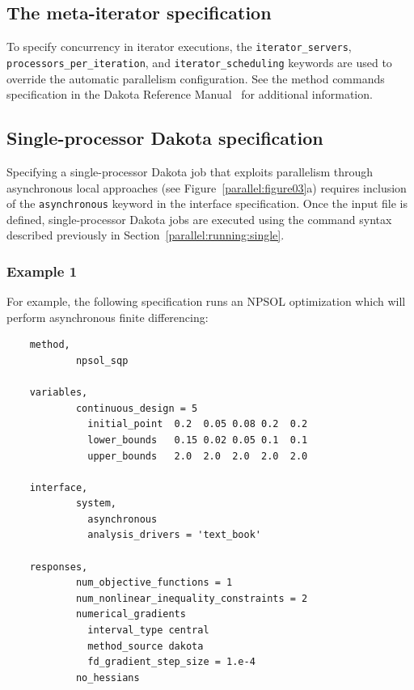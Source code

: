 \subsection{The meta-iterator specification}\label{parallel:spec:strategy}

To specify concurrency in iterator executions, the
\texttt{iterator\_servers}, \texttt{processors\_per\_iteration}, and
\texttt{iterator\_scheduling} keywords are used to override the 
automatic parallelism configuration. See the method commands 
specification in the Dakota Reference Manual~\cite{RefMan} for 
additional information.

\subsection{Single-processor Dakota specification}\label{parallel:spec:single}

Specifying a single-processor Dakota job that exploits parallelism
through asynchronous local approaches (see
Figure~\ref{parallel:figure03}a) requires inclusion of the
\texttt{asynchronous} keyword in the interface specification. Once the
input file is defined, single-processor Dakota jobs are executed using
the command syntax described previously in
Section~\ref{parallel:running:single}.

\subsubsection{Example 1}\label{parallel:spec:single:example1}

For example, the following specification runs an NPSOL optimization
which will perform asynchronous finite differencing:
\begin{small}
\begin{verbatim}
    method,
            npsol_sqp

    variables,
            continuous_design = 5
              initial_point  0.2  0.05 0.08 0.2  0.2
              lower_bounds   0.15 0.02 0.05 0.1  0.1
              upper_bounds   2.0  2.0  2.0  2.0  2.0

    interface,
            system,
              asynchronous
              analysis_drivers = 'text_book'

    responses,
            num_objective_functions = 1
            num_nonlinear_inequality_constraints = 2
            numerical_gradients
              interval_type central
              method_source dakota
              fd_gradient_step_size = 1.e-4
            no_hessians
\end{verbatim}
\end{small}

